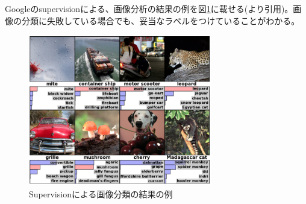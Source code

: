 Googleのsupervisionによる、画像分析の結果の例を図\ref{c3_supervision}に載せる(\cite{krizhevsky2012imagenet}より引用)。画像の分類に失敗している場合でも、妥当なラベルをつけていることがわかる。\begin{figure}[tbp]
 \begin{center}
  \includegraphics[width=80mm]{img/c3/supervision}
 \end{center}
 \caption{Supervisionによる画像分類の結果の例}
 \label{c3_supervision}
\end{figure}


